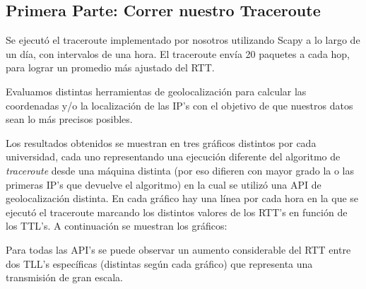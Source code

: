 \subsection{Primera Parte: Correr nuestro Traceroute}

Se ejecutó el traceroute implementado por nosotros utilizando Scapy a lo largo de un día, con intervalos de una hora. El traceroute envía 20 paquetes a cada hop, para lograr un promedio más ajustado del RTT.

Evaluamos distintas herramientas de geolocalización para calcular las coordenadas y/o la localización de las IP's con el objetivo de que nuestros datos sean lo más precisos posibles.


Los resultados obtenidos se muestran en tres gráficos distintos por cada universidad, cada uno representando una ejecución diferente del algoritmo de \textit{traceroute} desde una máquina distinta (por eso difieren con mayor grado la o las primeras IP's que devuelve el algoritmo) en la cual se utilizó una API de geolocalización distinta. En cada gráfico hay una línea por cada hora en la que se ejecutó el traceroute marcando los distintos valores de los RTT's en función de los TTL's. A continuación se muestran los gráficos:



 


 

 

Para todas las API's se puede observar un aumento considerable del RTT entre dos TLL's específicas (distintas según cada gráfico) que representa una transmisión de gran escala.

